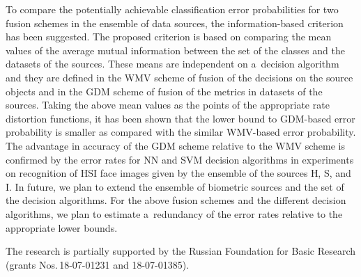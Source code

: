 \begin{multicols}{2}
\noindent
To compare the potentially achievable  classification error probabilities for two 
fusion schemes in the ensemble of data sources, the information-based criterion 
has been suggested. The proposed  criterion is based on comparing the mean 
values of the average mutual information between the set of the classes and the 
datasets of the sources. These means  are independent on a~decision algorithm 
and  they are defined in the WMV scheme of fusion of the decisions on the source 
objects and in the GDM scheme of fusion of the metrics in datasets of the sources. 
Taking the above mean values as the points of the appropriate rate distortion 
functions, it has been shown that the  lower bound to GDM-based error probability is 
smaller as compared with the similar WMV-based error probability. The advantage 
in accuracy of the GDM scheme relative to the WMV scheme is confirmed by the error 
rates for NN and SVM decision algorithms in experiments on recognition of HSI 
face images given by the ensemble of the sources Н, S, and I.
In future, we plan to 
extend the ensemble of biometric sources and the set of the decision algorithms.  
For the above fusion schemes and the different decision algorithms, we plan 
to estimate a~redundancy of the error rates relative to the appropriate lower 
bounds. 

\vspace*{-9pt}

\Ack
\noindent
The research is partially supported by the Russian Foundation for Basic Research 
(grants Nos.\,18-07-01231 and 18-07-01385).

\renewcommand{\bibname}{\protect\rmfamily References}


\vspace*{-9pt}


\end{multicols}
